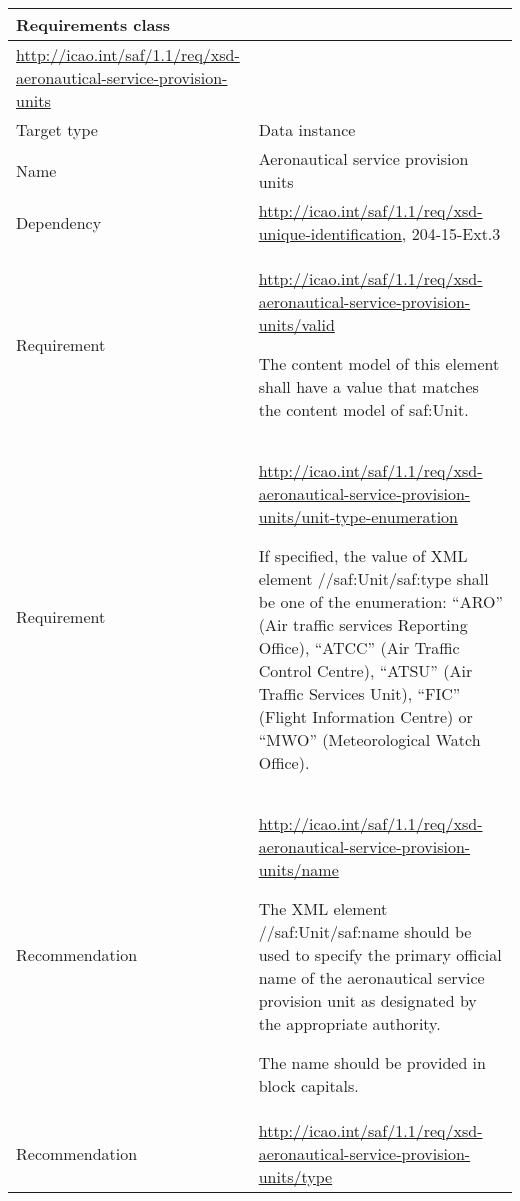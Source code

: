 \begin{longtable}[]{@{}ll@{}}
\toprule
Requirements class &\tabularnewline
\midrule
\endhead
\url{http://icao.int/saf/1.1/req/xsd-aeronautical-service-provision-units} &\tabularnewline
Target type & Data instance\tabularnewline
Name & Aeronautical service provision units\tabularnewline
Dependency & \url{http://icao.int/saf/1.1/req/xsd-unique-identification}, 204-15-Ext.3\tabularnewline
\begin{minipage}[t]{0.47\columnwidth}\raggedright
Requirement\strut
\end{minipage} & \begin{minipage}[t]{0.47\columnwidth}\raggedright
\url{http://icao.int/saf/1.1/req/xsd-aeronautical-service-provision-units/valid}

The content model of this element shall have a value that matches the content model of saf:Unit.\strut
\end{minipage}\tabularnewline
\begin{minipage}[t]{0.47\columnwidth}\raggedright
Requirement\strut
\end{minipage} & \begin{minipage}[t]{0.47\columnwidth}\raggedright
\url{http://icao.int/saf/1.1/req/xsd-aeronautical-service-provision-units/unit-type-enumeration}

If specified, the value of XML element //saf:Unit/saf:type shall be one of the enumeration: ``ARO'' (Air traffic services Reporting Office), ``ATCC'' (Air Traffic Control Centre), ``ATSU'' (Air Traffic Services Unit), ``FIC'' (Flight Information Centre) or ``MWO'' (Meteorological Watch Office).\strut
\end{minipage}\tabularnewline
\begin{minipage}[t]{0.47\columnwidth}\raggedright
Recommendation\strut
\end{minipage} & \begin{minipage}[t]{0.47\columnwidth}\raggedright
\url{http://icao.int/saf/1.1/req/xsd-aeronautical-service-provision-units/name}

The XML element //saf:Unit/saf:name should be used to specify the primary official name of the aeronautical service provision unit as designated by the appropriate authority.

The name should be provided in block capitals.\strut
\end{minipage}\tabularnewline
\begin{minipage}[t]{0.47\columnwidth}\raggedright
Recommendation\strut
\end{minipage} & \begin{minipage}[t]{0.47\columnwidth}\raggedright
\url{http://icao.int/saf/1.1/req/xsd-aeronautical-service-provision-units/type}


\end{minipage}
\end{longtable}
